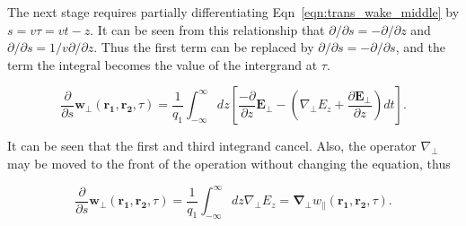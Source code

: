 The next stage requires partially differentiating Eqn~\ref{eqn:trans_wake_middle} by $s = v \tau = vt - z$. It can be seen from this relationship that $\partial / \partial s = - \partial / \partial z$ and $\partial / \partial s = 1/v \partial / \partial z$. Thus the first term can be replaced by $\partial / \partial s = - \partial / \partial s$, and the term the integral becomes the value of the intergrand at $\tau$.

\begin{equation}
\frac{\partial}{\partial s}\mathbf{w}_{\perp} \left(\mathbf{r_{1}}, \mathbf{r_{2}}, \tau   \right) = \frac{1}{q_{1}} \int^{\infty}_{-\infty} dz \left[ \frac{-\partial}{\partial z}\mathbf{E_{\perp}} - \left(  \nabla_{\perp}E_{z} + \frac{\partial\mathbf{E}_{\perp}}{\partial z} \right) dt \right].
\end{equation} 

It can be seen that the first and third integrand cancel. Also, the operator $\nabla_{\perp}$ may be moved to the front of the operation without changing the equation, thus

\begin{equation}
\frac{\partial}{\partial s}\mathbf{w}_{\perp} \left(\mathbf{r_{1}}, \mathbf{r_{2}}, \tau   \right) =  \frac{1}{q_{1}} \int^{\infty}_{-\infty} dz \nabla_{\perp}E_{z} = \mathbf{\nabla_{\perp}} w_{\parallel}\left( \mathbf{r_{1}}, \mathbf{r_{2}}, \tau   \right).
\end{equation}

